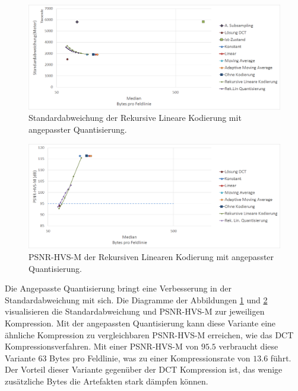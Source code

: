 \begin{figure}[!htbp]
	\center
	\includegraphics[width=1\textwidth,keepaspectratio]{./pictures/resultate/loesung2/variante3/resultate.png}
		
		\caption{Standardabweichung der Rekursive Lineare Kodierung mit angepasster Quantisierung.}
		\label{resultate:loesung2:adaptive:median:quant}
\end{figure}
\begin{figure}[!htbp]
\center
	\includegraphics[width=1\textwidth,keepaspectratio]{./pictures/resultate/loesung2/variante3/resultate_psnr.png}
	
	\caption{PSNR-HVS-M der Rekursiven Linearen Kodierung mit angepasster Quantisierung.}
	\label{resultate:loesung2:adaptive:median:quant_psnr}
\end{figure}
Die Angepasste Quantisierung bringt eine Verbesserung in der Standardabweichung mit sich. Die Diagramme der Abbildungen \ref{resultate:loesung2:adaptive:median:quant} und \ref{resultate:loesung2:adaptive:median:quant_psnr} visualisieren die Standardabweichung und PSNR-HVS-M zur jeweiligen Kompression. Mit der angepassten Quantisierung kann diese Variante eine ähnliche Kompression zu vergleichbaren PSNR-HVS-M erreichen, wie das DCT Kompressionsverfahren. Mit einer PSNR-HVS-M von $95.5$ verbraucht diese Variante $63$ Bytes pro Feldlinie, was zu einer Kompressionsrate von $13.6$ führt. Der Vorteil dieser Variante gegenüber der DCT Kompression ist, das wenige zusätzliche Bytes die Artefakten stark dämpfen können. 

